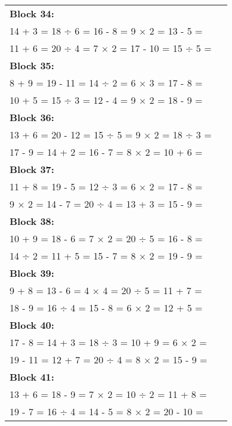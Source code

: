 \documentclass[a4paper,12pt]{scrartcl}
\begin{document}
\begin{adjustbox}{center, valign=c}
\begin{tabular}{@{}p{0.95\linewidth}@{}}

\textbf{Block 34:}\\
14 + 3 = \hfill 18 ÷ 6 = \hfill 16 - 8 = \hfill 9 × 2 = \hfill 13 - 5 =\\
11 + 6 = \hfill 20 ÷ 4 = \hfill 7 × 2 = \hfill 17 - 10 = \hfill 15 ÷ 5 =\\[0.6em]

\textbf{Block 35:}\\
8 + 9 = \hfill 19 - 11 = \hfill 14 ÷ 2 = \hfill 6 × 3 = \hfill 17 - 8 =\\
10 + 5 = \hfill 15 ÷ 3 = \hfill 12 - 4 = \hfill 9 × 2 = \hfill 18 - 9 =\\[0.6em]

\textbf{Block 36:}\\
13 + 6 = \hfill 20 - 12 = \hfill 15 ÷ 5 = \hfill 9 × 2 = \hfill 18 ÷ 3 =\\
17 - 9 = \hfill 14 + 2 = \hfill 16 - 7 = \hfill 8 × 2 = \hfill 10 + 6 =\\[0.6em]

\textbf{Block 37:}\\
11 + 8 = \hfill 19 - 5 = \hfill 12 ÷ 3 = \hfill 6 × 2 = \hfill 17 - 8 =\\
9 × 2 = \hfill 14 - 7 = \hfill 20 ÷ 4 = \hfill 13 + 3 = \hfill 15 - 9 =\\[0.6em]

\textbf{Block 38:}\\
10 + 9 = \hfill 18 - 6 = \hfill 7 × 2 = \hfill 20 ÷ 5 = \hfill 16 - 8 =\\
14 ÷ 2 = \hfill 11 + 5 = \hfill 15 - 7 = \hfill 8 × 2 = \hfill 19 - 9 =\\[0.6em]

\textbf{Block 39:}\\
9 + 8 = \hfill 13 - 6 = \hfill 4 × 4 = \hfill 20 ÷ 5 = \hfill 11 + 7 =\\
18 - 9 = \hfill 16 ÷ 4 = \hfill 15 - 8 = \hfill 6 × 2 = \hfill 12 + 5 =\\[0.6em]

\textbf{Block 40:}\\
17 - 8 = \hfill 14 + 3 = \hfill 18 ÷ 3 = \hfill 10 + 9 = \hfill 6 × 2 =\\
19 - 11 = \hfill 12 + 7 = \hfill 20 ÷ 4 = \hfill 8 × 2 = \hfill 15 - 9 =\\[0.6em]

\textbf{Block 41:}\\
13 + 6 = \hfill 18 - 9 = \hfill 7 × 2 = \hfill 10 ÷ 2 = \hfill 11 + 8 =\\
19 - 7 = \hfill 16 ÷ 4 = \hfill 14 - 5 = \hfill 8 × 2 = \hfill 20 - 10 =\\[0.6em]


\end{tabular}
\end{adjustbox}
\end{document}
